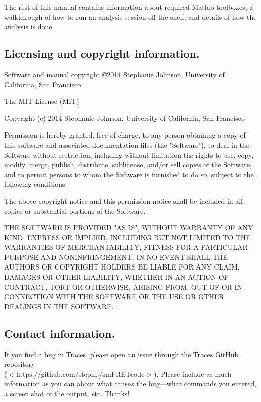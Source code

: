\documentclass[11pt]{article}
\newcommand{\sj}[1]{\textcolor{red}{#1}}
\begin{document}
The rest of this manual contains information about required Matlab toolboxes, a walkthrough of how to run an analysis session off-the-shelf, and details of how the analysis is done.


\subsection{Licensing and copyright information.}

Software and manual copyright \copyright 2014 Stephanie Johnson, University of California, San Francisco.

 The MIT License (MIT)
 
 Copyright (c) 2014 Stephanie Johnson, University of California, San Francisco
 
 Permission is hereby granted, free of charge, to any person obtaining a copy
 of this software and associated documentation files (the "Software"), to deal
 in the Software without restriction, including without limitation the rights
 to use, copy, modify, merge, publish, distribute, sublicense, and/or sell
 copies of the Software, and to permit persons to whom the Software is
 furnished to do so, subject to the following conditions:
 
 The above copyright notice and this permission notice shall be included in all
 copies or substantial portions of the Software.
 
 THE SOFTWARE IS PROVIDED "AS IS", WITHOUT WARRANTY OF ANY KIND, EXPRESS OR
 IMPLIED, INCLUDING BUT NOT LIMITED TO THE WARRANTIES OF MERCHANTABILITY,
 FITNESS FOR A PARTICULAR PURPOSE AND NONINFRINGEMENT. IN NO EVENT SHALL THE
 AUTHORS OR COPYRIGHT HOLDERS BE LIABLE FOR ANY CLAIM, DAMAGES OR OTHER
 LIABILITY, WHETHER IN AN ACTION OF CONTRACT, TORT OR OTHERWISE, ARISING FROM,
 OUT OF OR IN CONNECTION WITH THE SOFTWARE OR THE USE OR OTHER DEALINGS IN THE
 SOFTWARE.
    
\subsection{Contact information.}

If you find a bug in Traces, please open an issue through the Traces GitHub repository \\
($<$https://github.com/stephlj/smFRETcode$>$). Please include as much information as you can about what causes the bug---what commands you entered, a screen shot of the output, {\textit etc}.  Thanks!
\end{document}
